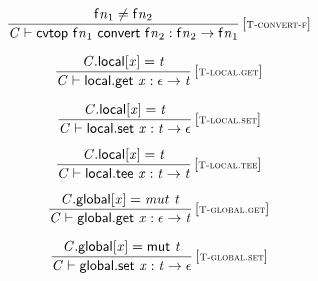 $$
\begin{array}{@{}c@{}}\displaystyle
\frac{
{{\mathsf{f}}{{\mathit{n}}}}_{{1}} \neq {{\mathsf{f}}{{\mathit{n}}}}_{{2}}
}{
{\mathit{C}} \vdash \mathsf{cvtop}~{{\mathsf{f}}{{\mathit{n}}}}_{{1}}~\mathsf{convert}~{{\mathsf{f}}{{\mathit{n}}}}_{{2}} : {{\mathsf{f}}{{\mathit{n}}}}_{{2}} \rightarrow {{\mathsf{f}}{{\mathit{n}}}}_{{1}}
} \, {[\textsc{\scriptsize T{-}convert{-}f}]}
\qquad
\end{array}
$$

\vspace{1ex}

$$
\begin{array}{@{}c@{}}\displaystyle
\frac{
{\mathit{C}}.\mathsf{local}{}[{\mathit{x}}] = {\mathit{t}}
}{
{\mathit{C}} \vdash \mathsf{local.get}~{\mathit{x}} : \epsilon \rightarrow {\mathit{t}}
} \, {[\textsc{\scriptsize T{-}local.get}]}
\qquad
\end{array}
$$

$$
\begin{array}{@{}c@{}}\displaystyle
\frac{
{\mathit{C}}.\mathsf{local}{}[{\mathit{x}}] = {\mathit{t}}
}{
{\mathit{C}} \vdash \mathsf{local.set}~{\mathit{x}} : {\mathit{t}} \rightarrow \epsilon
} \, {[\textsc{\scriptsize T{-}local.set}]}
\qquad
\end{array}
$$

$$
\begin{array}{@{}c@{}}\displaystyle
\frac{
{\mathit{C}}.\mathsf{local}{}[{\mathit{x}}] = {\mathit{t}}
}{
{\mathit{C}} \vdash \mathsf{local.tee}~{\mathit{x}} : {\mathit{t}} \rightarrow {\mathit{t}}
} \, {[\textsc{\scriptsize T{-}local.tee}]}
\qquad
\end{array}
$$

\vspace{1ex}

$$
\begin{array}{@{}c@{}}\displaystyle
\frac{
{\mathit{C}}.\mathsf{global}{}[{\mathit{x}}] = {\mathit{mut}}~{\mathit{t}}
}{
{\mathit{C}} \vdash \mathsf{global.get}~{\mathit{x}} : \epsilon \rightarrow {\mathit{t}}
} \, {[\textsc{\scriptsize T{-}global.get}]}
\qquad
\end{array}
$$

$$
\begin{array}{@{}c@{}}\displaystyle
\frac{
{\mathit{C}}.\mathsf{global}{}[{\mathit{x}}] = \mathsf{mut}~{\mathit{t}}
}{
{\mathit{C}} \vdash \mathsf{global.set}~{\mathit{x}} : {\mathit{t}} \rightarrow \epsilon
} \, {[\textsc{\scriptsize T{-}global.set}]}
\qquad
\end{array}
$$

